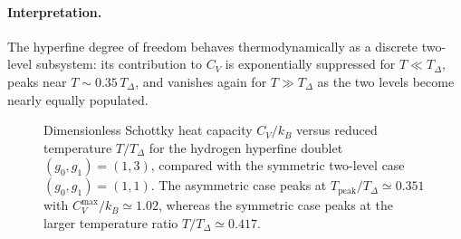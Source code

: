 \documentclass[11pt,a4paper]{article}
\begin{document}
        \paragraph{Interpretation.}
            The hyperfine degree of freedom behaves thermodynamically as a discrete two-level subsystem:
            its contribution to $C_V$ is exponentially suppressed for $T\ll T_\Delta$, peaks near $T\sim 0.35\,T_\Delta$,
            and vanishes again for $T\gg T_\Delta$ as the two levels become nearly equally populated.
            
            \begin{figure}[t]
                \centering
                \caption{
                    Dimensionless Schottky heat capacity $C_V/k_B$ versus reduced temperature $T/T_\Delta$
                    for the hydrogen hyperfine doublet $(g_0,g_1)=(1,3)$, compared with the symmetric two-level case $(g_0,g_1)=(1,1)$.
                    The asymmetric case peaks at $T_{\mathrm{peak}}/T_\Delta\simeq 0.351$ with $C_V^{\max}/k_B\simeq 1.02$,
                    whereas the symmetric case peaks at the larger temperature ratio $T/T_\Delta\simeq 0.417$.
                }
                \label{fig:schottky_hfs}
            \end{figure}
\end{document}
